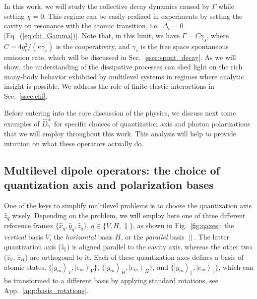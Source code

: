 \documentclass[aps,prx,superscriptaddress,twocolumn,notitlepage,nofootinbib,longbibliography]{revtex4-2}
\newcommand{\ket}[1]{\left|#1\right>}
\newcommand{\quv}{\hat{z}}
\newcommand{\qusub}{q}
\begin{document}
In this work, we will study the collective decay dynamics caused by $\Gamma$ while setting $\chi=0$.
This regime can be easily realized in experiments by setting the cavity on resonance with the atomic transition, i.e.~$\Delta_c=0$ [Eq.~(\ref{eq:chi_Gamma})].
Note that, in this limit, we have $\Gamma=C\gamma_s$, where $C=4g_c^2/(\kappa\gamma_s)$ is the cooperativity, and $\gamma_s$ is the free space spontaneous emission rate, which will be discussed in Sec.~\ref{ssec:spont_decay}.
As we will show, the understanding of the dissipative processes can shed light on the rich many-body behavior exhibited by multilevel  systems in regimes where analytic insight is possible.  We  address the role of finite elastic interactions in Sec.~\ref{ssec:chi}.



Before entering into the core discussion of the physics, we discuss next some examples of $\hat{D}^\pm_\gamma$ for specific choices of quantization axis and photon polarizations that we will employ throughout this work. This analysis will help to  provide intuition on what these operators actually do.







\subsection{Multilevel dipole operators: the choice of quantization axis and polarization bases\label{ssec:pol_atom_bases}}


One of the keys to simplify multilevel problems is to choose the quantization axis $\quv_\qusub$ wisely.
Depending on the problem, we will employ here one of three different reference frames $\{\hat{x}_{\qusub},\hat{y}_{\qusub},\hat{z}_{\qusub}\}$, $q\in\{V,H,\parallel\}$, as shown in Fig.~\ref{fig:qaxes}:
the \emph{vertical} basis $V$, the \emph{horizontal} basis $H$, or the \emph{parallel} basis $\parallel$. The latter quantization axis ($\quv_\parallel$) is aligned parallel to the cavity axis, whereas the other two ($\quv_V$, $\quv_H$) are orthogonal to it.
Each of these quantization axes defines a basis of atomic states, $\{\ket{g_m}_{V}, \ket{e_m}_{V}\}$, $\{\ket{g_m}_{H}, \ket{e_m}_{H}\}$, and $\{\ket{g_m}_{\parallel}, \ket{e_m}_{\parallel}\}$, which can be transformed to a different basis by applying standard rotations, see App.~\ref{app:basis_rotations}.
\end{document}
